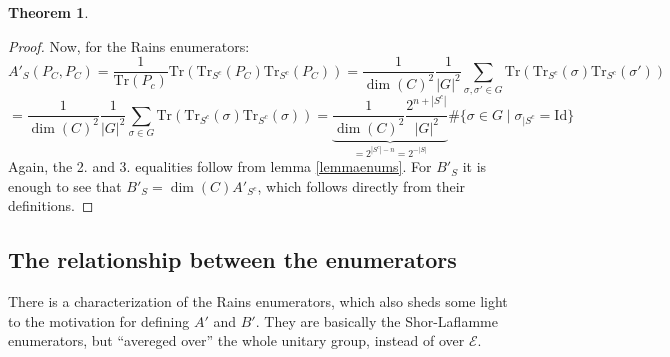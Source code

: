 \documentclass{article}
\def\E{\mathcal{E}}
\def\Tr{\text{Tr}}
\def\Id{\text{Id}}
\theoremstyle{definition}
\newtheorem{theorem}[Satz]{Theorem}
\begin{document}
\begin{theorem}
\begin{proof}
Now, for the Rains enumerators: 
\begin{equation} A'_S(P_C,P_C) = \frac{1}{\Tr(P_c)} \Tr(\Tr_{S^c}(P_C)\Tr_{S^c}(P_C)) = \frac{1}{\dim (C)^2} \frac{1}{|G|^2} \sum_{\sigma, \sigma' \in G}  \Tr(\Tr_{S^c}(\sigma)\Tr_{S^c}(\sigma')) \end{equation}
\begin{equation} = \frac{1}{\dim (C)^2} \frac{1}{|G|^2} \sum_{\sigma \in G}  \Tr(\Tr_{S^c}(\sigma)\Tr_{S^c}(\sigma)) = \underbrace{\frac{1}{\dim (C)^2} \frac{2^{n+|S^c|}}{|G|^2}}_{= 2^{|S^c| - n}=2^{-|S|}} \# \{ \sigma \in G \mid \sigma_{\big| S^c} = \Id \} \end{equation}
Again, the 2. and 3. equalities follow from lemma \ref{lemmaenums}. For $B'_S$ it is enough to see that $B'_{S} = \dim (C) A'_{S^c}$, which follows directly from their definitions.
\end{proof}

\end{theorem}

\subsection{The relationship between the enumerators}

There is a characterization of the Rains enumerators, which also sheds some light to the motivation for defining $A'$ and $B'$. 
They are basically the Shor-Laflamme enumerators, but ``avereged over'' the whole unitary group, instead of over $\E$.
\end{document}
